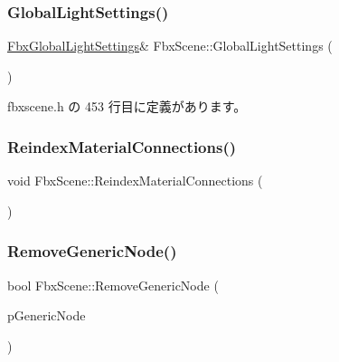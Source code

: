 \mbox{\label{class_fbx_scene_a0583b181b70f56655f06dbe79b43fcd6}} 
\subsubsection{\texorpdfstring{Global\+Light\+Settings()}{GlobalLightSettings()}}
{\footnotesize\ttfamily \hyperlink{class_fbx_global_light_settings}{Fbx\+Global\+Light\+Settings}\& Fbx\+Scene\+::\+Global\+Light\+Settings (\begin{DoxyParamCaption}{ }\end{DoxyParamCaption})\hspace{0.3cm}{\ttfamily [inline]}}



 fbxscene.\+h の 453 行目に定義があります。

\mbox{\label{class_fbx_scene_ab36c6e602ec8eb39c9b0934f24a71886}} 
\subsubsection{\texorpdfstring{Reindex\+Material\+Connections()}{ReindexMaterialConnections()}}
{\footnotesize\ttfamily void Fbx\+Scene\+::\+Reindex\+Material\+Connections (\begin{DoxyParamCaption}{ }\end{DoxyParamCaption})}

\mbox{\label{class_fbx_scene_ada01a14ed31636b615d6e95c1f33e2ca}} 
\subsubsection{\texorpdfstring{Remove\+Generic\+Node()}{RemoveGenericNode()}}
{\footnotesize\ttfamily bool Fbx\+Scene\+::\+Remove\+Generic\+Node (\begin{DoxyParamCaption}\item[{\hyperlink{class_fbx_generic_node}{Fbx\+Generic\+Node} $\ast$}]{p\+Generic\+Node }\end{DoxyParamCaption})}

